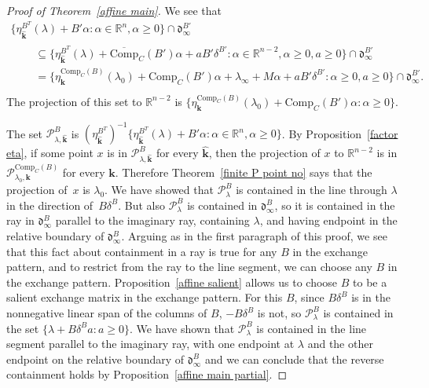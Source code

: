 \documentclass[10pt]{article}
\theoremstyle{definition}
\theoremstyle{remark}
\numberwithin{equation}{section}
\newcommand{\reals}{\mathbb R}
\newcommand{\set}[1]{{\lbrace #1 \rbrace}}
\newcommand{\0}{{\mathbf{0}}}
\newcommand{\Comp}{\mathrm{Comp}_C}
\newcommand{\CompPlus}{\overline{\mathrm{Comp}}_C}
\newcommand{\kk}{{\boldsymbol{k}}}
\renewcommand{\P}{\mathcal{P}}
\renewcommand{\d}{{\mathfrak d}}
\begin{document}
\begin{proof}[Proof of Theorem~\ref{affine main}]
We see that 
\begin{multline*}
  \set{\eta_{\widehat\kk}^{B^T}(\lambda)+B'\alpha:\alpha\in\reals^n,\alpha\ge0}\cap\d^{B'}_\infty\\
\begin{aligned}
&\quad\subseteq\set{\eta_{\widehat\kk}^{B^T}(\lambda)+\CompPlus(B')\alpha+aB'\delta^{B'}:\alpha\in\reals^{n-2},\alpha\ge0,a\ge0}\cap\d^{B'}_\infty\\
&\quad=\set{\eta_\kk^{\Comp(B)}(\lambda_0)+\Comp(B')\alpha+\lambda_\infty+M\alpha+aB'\delta^{B'}:\alpha\ge0,a\ge0}\cap\d^{B'}_\infty.\\
\end{aligned}
\end{multline*}
The projection of this set to $\reals^{n-2}$ is $\set{\eta_\kk^{\Comp(B)}(\lambda_0)+\Comp(B')\alpha:\alpha\ge0}$.

The set $\P^B_{\lambda,\widehat\kk}$ is $(\eta_{\widehat\kk}^{B^T})^{-1}\set{\eta_{\widehat\kk}^{B^T}(\lambda)+B'\alpha:\alpha\in\reals^n,\alpha\ge0}$.
By Proposition~\ref{factor eta}, if some point $x$ is in $\P^B_{\lambda,\widehat\kk}$  
for every $\widehat\kk$, then the projection of $x$ to $\reals^{n-2}$ is in $\P^{\Comp(B)}_{\lambda_0,\kk}$ for every $\kk$.
Therefore Theorem~\ref{finite P point no} says that the projection of~$x$ is $\lambda_0$.
We have showed that $\P^B_\lambda$ is contained in the line through $\lambda$ in the direction of~$B\delta^B$.
But also $\P^B_\lambda$ is contained in $\d^B_\infty$, so it is contained in the ray in $\d^B_\infty$ parallel to the imaginary ray, containing $\lambda$, and having endpoint in the relative boundary of $\d^B_\infty$.
Arguing as in the first paragraph of this proof, we see that this fact about containment in a ray is true for any $B$ in the exchange pattern, and to restrict from the ray to the line segment, we can choose any $B$ in the exchange pattern.
Proposition~\ref{affine salient} allows us to choose $B$ to be a salient exchange matrix in the exchange pattern.
For this $B$, since $B\delta^B$ is in the nonnegative linear span of the columns of $B$, $-B\delta^B$ is not, so $\P^B_\lambda$ is contained in the set $\set{\lambda+B\delta^Ba:a\ge0}$.
We have shown that $\P^B_\lambda$ is contained in the line segment parallel to the imaginary ray, with one endpoint at $\lambda$ and the other endpoint on the relative boundary of $\d^B_\infty$ and we can conclude that the reverse containment holds by Proposition~\ref{affine main partial}.
\end{proof}
\end{document}
